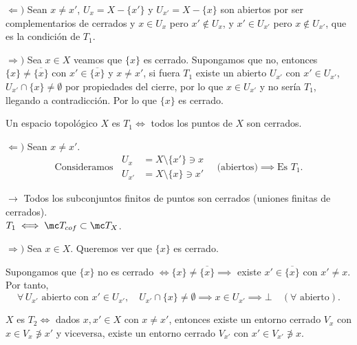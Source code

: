 \begin{dem}
$\Leftarrow) $ Sean $x\neq x'$, $U_x = X- \{x'\}$ y $U_{x'} = X - \{x\}$ son abiertos por ser complementarios de cerrados y $x\in U_x$ pero $x'\nin U_x$, y $x'\in U_{x'}$ pero $x\nin U_{x'}$, que es la condici\'on de $T_1$.

$\Rightarrow)$ Sea $x\in X$ veamos que $\{x\}$ es cerrado. Supongamos que no, entonces $\{x\} \neq \overline{\{x\}}$ con $x'\in \overline{\{x\}}$ y $x\neq x'$, si fuera $T_1$ existe un abierto $U_{x'}$ con $x'\in U_{x'}$, $U_{x'}\cap \{x\} \neq \emptyset$ por propiedades del cierre, por lo que $x \in U_{x'}$ y no ser\'ia $T_1$, llegando a contradicci\'on. Por lo que $\{x\}$ es cerrado. 
\end{dem}
\begin{prop}
    Un espacio topológico $X$ es $T_1 \iff$ todos los puntos de $X$ son cerrados.
\end{prop}
\begin{dem} $\Leftarrow)$ Sean $x \ne x'$.
        \[
            \text{Consideramos  } \,  
            \begin{aligned}
                U_x &= X \setminus \{x'\} \ni x \\
                U_{x'} &= X \setminus \{x\} \ni x'
            \end{aligned}
            \quad \text{(abiertos)} \implies \text{Es } T_1.
        \]
        \begin{flushright}
            \footnotesize
            $\rightarrow$ Todos los subconjuntos finitos de puntos son cerrados (uniones finitas de cerrados). \\
            $T_1 \iff \mc T_{cof} \subset \mc T_X$.
        \end{flushright}

        $\Rightarrow)$ Sea $x \in X$. Queremos ver que $\{x\}$ es cerrado.
        
        Supongamos que $\{x\}$ no es cerrado $\iff \{x\} \ne \overline{\{x\}} \implies$ existe $x' \in \overline{\{x\}}$ con $x' \ne x$. Por tanto, 
        \[
            \forall \, U_{x'} \text{ abierto con } x' \in U_{x'}, \quad U_{x'} \cap \{x\} \ne \emptyset \implies x \in U_{x'} \implies \bot \quad (\forall \text{ abierto}).
        \]
\end{dem}

\begin{prop}
    $X$ es $T_2 \iff$ dados $x, x' \in X$ con $x \ne x'$, entonces existe un entorno cerrado $V_x$ con $x \in V_x \not\ni x'$ y viceversa, existe un entorno cerrado $V_{x'}$ con $x' \in V_{x'} \not\ni x$.
\end{prop}

